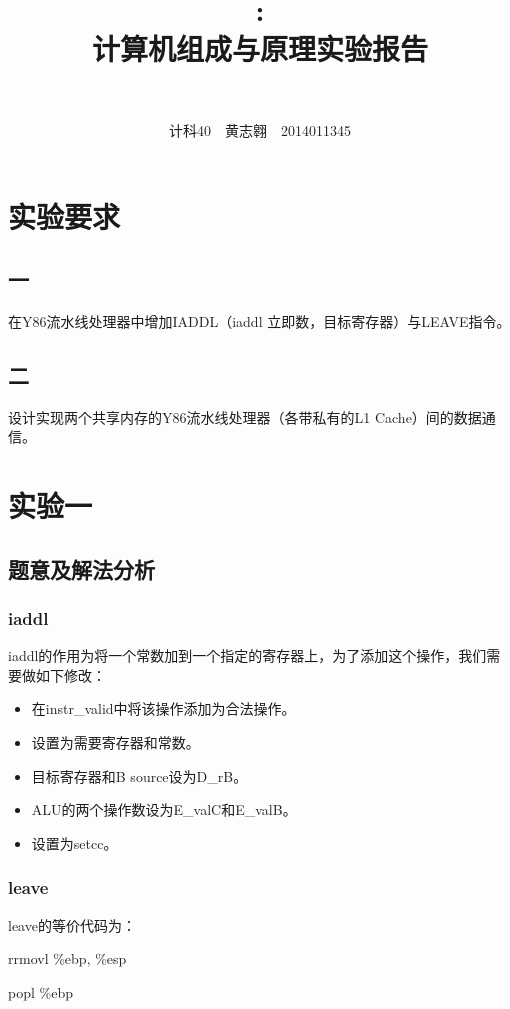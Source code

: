 \documentclass{article}
\title{\textmd{\bf \Class: \Title}\\\normalsize\vspace{0.1in}}
\author{\textbf{\StudentName}\ \ \StudentNumber}
\theoremstyle{plain} \newtheorem{theorem}{常识}[section]
\theoremstyle{plain} \newtheorem{lizi}{例}[section]
\begin{document}
\title{计算机组成与原理实验报告}
\author{计科40~~黄志翱~~2014011345}
\maketitle

\section{实验要求}
\subsection{一}
在Y86流水线处理器中增加IADDL（iaddl 立即数，目标寄存器）与LEAVE指令。

\subsection{二}
设计实现两个共享内存的Y86流水线处理器（各带私有的L1 Cache）间的数据通信。

\section{实验一}
\subsection{题意及解法分析}
\subsubsection{iaddl}
iaddl的作用为将一个常数加到一个指定的寄存器上，为了添加这个操作，我们需要做如下修改：

\begin{itemize}
    \item 在instr\_valid中将该操作添加为合法操作。
    \item 设置为需要寄存器和常数。
    \item 目标寄存器和B source设为D\_rB。
    \item ALU的两个操作数设为E\_valC和E\_valB。
    \item 设置为setcc。
\end{itemize}

\subsubsection{leave}
leave的等价代码为：

rrmovl \%ebp, \%esp

popl \%ebp
\end{document}
